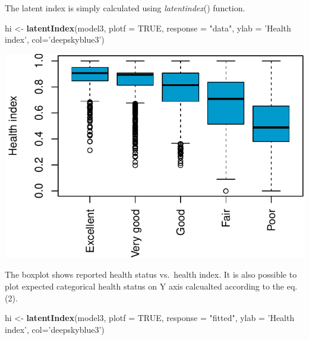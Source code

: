 \documentclass[]{article}
\newenvironment{Shaded}{\begin{snugshade}}{\end{snugshade}}
\newcommand{\DataTypeTok}[1]{\textcolor[rgb]{0.13,0.29,0.53}{#1}}
\newcommand{\KeywordTok}[1]{\textcolor[rgb]{0.13,0.29,0.53}{\textbf{#1}}}
\newcommand{\NormalTok}[1]{#1}
\newcommand{\OtherTok}[1]{\textcolor[rgb]{0.56,0.35,0.01}{#1}}
\newcommand{\StringTok}[1]{\textcolor[rgb]{0.31,0.60,0.02}{#1}}
\begin{document}
The latent index is simply calculated using \emph{latentindex}()
function.

\begin{Shaded}
\begin{Highlighting}[]
\NormalTok{hi <-}\StringTok{ }\KeywordTok{latentIndex}\NormalTok{(model3, }\DataTypeTok{plotf =} \OtherTok{TRUE}\NormalTok{, }\DataTypeTok{response =} \StringTok{"data"}\NormalTok{, }
                  \DataTypeTok{ylab =} \StringTok{'Health index'}\NormalTok{, }\DataTypeTok{col=}\StringTok{'deepskyblue3'}\NormalTok{)}
\end{Highlighting}
\end{Shaded}

\begin{center}\includegraphics{vignette_files/figure-latex/unnamed-chunk-16-1} \end{center}

The boxplot shows reported health status vs.~health index. It is also
possible to plot expected categorical health status on Y axis calcualted
according to the eq. (2).

\begin{Shaded}
\begin{Highlighting}[]
\NormalTok{hi <-}\StringTok{ }\KeywordTok{latentIndex}\NormalTok{(model3, }\DataTypeTok{plotf =} \OtherTok{TRUE}\NormalTok{, }\DataTypeTok{response =} \StringTok{"fitted"}\NormalTok{, }
                  \DataTypeTok{ylab =} \StringTok{'Health index'}\NormalTok{, }\DataTypeTok{col=}\StringTok{'deepskyblue3'}\NormalTok{)}
\end{Highlighting}
\end{Shaded}
\end{document}
